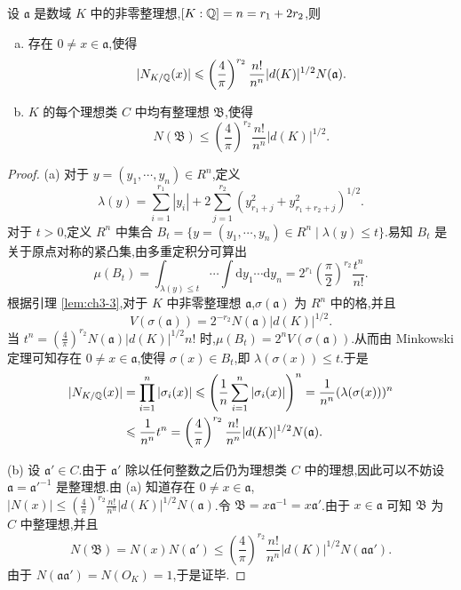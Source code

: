 \begin{lemma}\label{lem:ch3-4}
设 $\mathfrak{a}$ 是数域 $K$ 中的非零整理想,$[K:\mathbb{Q}]=n=r_1+2r_2$,则
\begin{enumerate}[(a)]
  \item 存在 $0\neq x\in\mathfrak{a}$,使得
  \[
    |N_{K/\mathbb{Q}}(x)|\leqslant\left(\frac{4}{\pi}\right)^{r_2}\frac{n!}{n^n}|d(K)|^{1/2}N(\mathfrak{a}).
  \]
  \item $K$ 的每个理想类 $C$ 中均有整理想 $\mathfrak{B}$,使得
  \[
    N(\mathfrak{B})\leqslant\left(\frac{4}{\pi}\right)^{r_2}\frac{n!}{n^n}|d(K)|^{1/2}.
  \]
\end{enumerate}
\end{lemma}

\begin{proof}
(a) 对于 $y=(y_1,\cdots,y_n)\in R^n$,定义
\[
  \lambda(y)=\sum_{i=1}^{r_1}|y_i|+2\sum_{j=1}^{r_2}\left(y_{r_1+j}^2+y_{r_1+r_2+j}^2\right)^{1/2}.
\]
对于 $t>0$,定义 $R^n$ 中集合 $B_t=\{y=(y_1,\cdots,y_n)\in R^n\mid\lambda(y)\leqslant t\}$.易知 $B_t$ 是关于原点对称的紧凸集,由多重定积分可算出
\[
  \mu(B_t)=\int_{\lambda(y)\leqslant t}\cdots\int\mathrm{d}y_1\cdots\mathrm{d}y_n
  =2^{r_1}\left(\frac{\pi}{2}\right)^{r_2}\frac{t^n}{n!}.
\]
根据引理 \ref{lem:ch3-3},对于 $K$ 中非零整理想 $\mathfrak{a}$,$\sigma(\mathfrak{a})$ 为 $R^n$ 中的格,并且
\[
  V(\sigma(\mathfrak{a}))=2^{-r_2}N(\mathfrak{a})|d(K)|^{1/2}.
\]
当 $t^n=\left(\frac{4}{\pi}\right)^{r_2}N(\mathfrak{a})|d(K)|^{1/2}n!$ 时,$\mu(B_t)=2^nV(\sigma(\mathfrak{a}))$.从而由 Minkowski 定理可知存在 $0\neq x\in\mathfrak{a}$,使得 $\sigma(x)\in B_t$,即 $\lambda(\sigma(x))\leqslant t$.于是
\begin{align*}
  |N_{K/\mathbb{Q}}(x)|&=\prod_{i=1}^{n}|\sigma_i(x)|
  \leqslant\left(\frac{1}{n}\sum_{i=1}^{n}|\sigma_i(x)|\right)^n
  =\frac{1}{n^n}(\lambda(\sigma(x)))^n\\
  &\leqslant\frac{1}{n^n}t^n
  =\left(\frac{4}{\pi}\right)^{r_2}\frac{n!}{n^n}|d(K)|^{1/2}N(\mathfrak{a}).
\end{align*}

(b) 设 $\mathfrak{a}'\in C$.由于 $\mathfrak{a}'$ 除以任何整数之后仍为理想类 $C$ 中的理想,因此可以不妨设 $\mathfrak{a}=\mathfrak{a}'^{-1}$ 是整理想.由 (a) 知道存在 $0\neq x\in\mathfrak{a}$,$|N(x)|\leqslant\left(\frac{4}{\pi}\right)^{r_2}\frac{n!}{n^n}|d(K)|^{1/2}N(\mathfrak{a})$.令 $\mathfrak{B}=x\mathfrak{a}^{-1}=x\mathfrak{a}'$.由于 $x\in\mathfrak{a}$ 可知 $\mathfrak{B}$ 为 $C$ 中整理想,并且
\[
  N(\mathfrak{B})=N(x)N(\mathfrak{a}')\leqslant\left(\frac{4}{\pi}\right)^{r_2}\frac{n!}{n^n}|d(K)|^{1/2}N(\mathfrak{a}\mathfrak{a}').
\]
由于 $N(\mathfrak{a}\mathfrak{a}')=N(O_K)=1$,于是证毕.
\end{proof}

